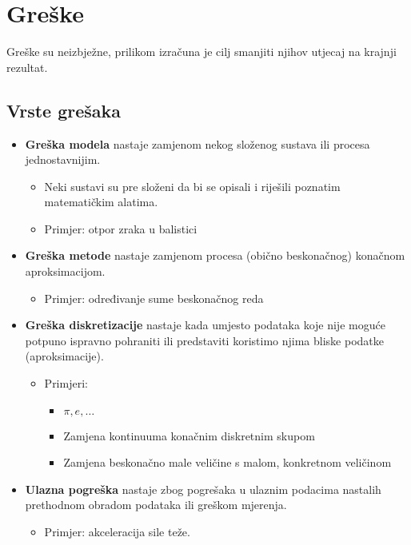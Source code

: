 \section{Greške}

Greške su neizbježne, prilikom izračuna je cilj smanjiti njihov utjecaj na krajnji rezultat.

\subsection{Vrste grešaka}

\begin{itemize}
    \item \textbf{Greška modela} nastaje zamjenom nekog složenog sustava ili procesa jednostavnijim.
    \begin{itemize}
        \item Neki sustavi su pre složeni da bi se opisali i riješili poznatim matematičkim alatima.
        \item Primjer: otpor zraka u balistici
    \end{itemize}
    \item \textbf{Greška metode} nastaje zamjenom procesa (obično beskonačnog) konačnom aproksimacijom.
    \begin{itemize}
        \item Primjer: određivanje sume beskonačnog reda
    \end{itemize}
    \item \textbf{Greška diskretizacije} nastaje kada umjesto podataka koje nije moguće potpuno ispravno pohraniti ili predstaviti koristimo njima bliske podatke (aproksimacije).
    \begin{itemize}
        \item Primjeri:
        \begin{itemize}
            \item $\pi, e, \dots$
            \item Zamjena kontinuuma konačnim diskretnim skupom
            \item Zamjena beskonačno male veličine s malom, konkretnom veličinom
        \end{itemize}
    \end{itemize}
    \item \textbf{Ulazna pogreška} nastaje zbog pogrešaka u ulaznim podacima nastalih prethodnom obradom podataka ili greškom mjerenja.
    \begin{itemize}
        \item Primjer: akceleracija sile teže.
    \end{itemize}
\end{itemize}

